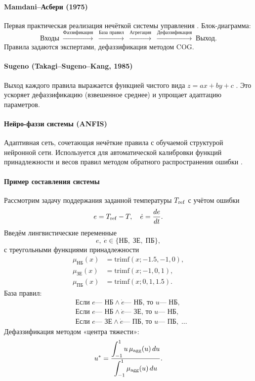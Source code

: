 \paragraph{Mamdani–Асбери (1975)}
Первая практическая реализация нечёткой системы управления \cite{Mamdani1975}. Блок-диаграмма:
\[
  \text{Входы} \;\xrightarrow{\text{Фаззификация}}\; 
  \xrightarrow{\text{База правил}}\;\xrightarrow{\text{Агрегация}}\;
  \xrightarrow{\text{Дефаззификация}}\;\text{Выход}.
\]
Правила задаются экспертами, дефаззификация методом COG.

\paragraph{Sugeno (Takagi–Sugeno–Kang, 1985)}
Выход каждого правила выражается функцией чистого вида \(z = a x + b y + c\) \cite{Sugeno1985}. Это ускоряет дефаззификацию (взвешенное среднее) и упрощает адаптацию параметров.

\paragraph{Нейро-фаззи системы (ANFIS)}
Адаптивная сеть, сочетающая нечёткие правила с обучаемой структурой нейронной сети. Используется для автоматической калибровки функций принадлежности и весов правил методом обратного распространения ошибки \cite{Jang1993}.

\paragraph{Пример составления системы}

\begin{example}
Рассмотрим задачу поддержания заданной температуры $T_{\rm ref}$ с учётом ошибки 
\[
  e = T_{\rm ref} - T,\quad 
  \dot e = \frac{de}{dt}.
\]
Введём лингвистические переменные
\[
  e,\ \dot e \in \{\text{НБ},\;\text{ЗЕ},\;\text{ПБ}\},
\]
с треугольными функциями принадлежности
\begin{align*}
  \mu_{\mathrm{НБ}}(x) &= \mathrm{trimf}(x; -1.5, -1, 0),\\
  \mu_{\mathrm{ЗЕ}}(x) &= \mathrm{trimf}(x; -1, 0, 1),\\
  \mu_{\mathrm{ПБ}}(x) &= \mathrm{trimf}(x; 0, 1, 1.5).
\end{align*}
База правил:
\[
\begin{aligned}
&\text{Если }e\text{— НБ}\land\dot e\text{— НБ, то }u\text{— НБ},\\
&\text{Если }e\text{— НБ}\land\dot e\text{— ЗЕ, то }u\text{— НБ},\\
&\text{Если }e\text{— ЗЕ}\land\dot e\text{— ПБ, то }u\text{— ПБ},\;\dots
\end{aligned}
\]
Дефаззификация методом «центра тяжести»:
\[
  u^* 
  = \frac{\displaystyle\int_{-1}^{1} u\,\mu_{\rm agg}(u)\,du}
         {\displaystyle\int_{-1}^{1}\mu_{\rm agg}(u)\,du}.
\]
\end{example}

